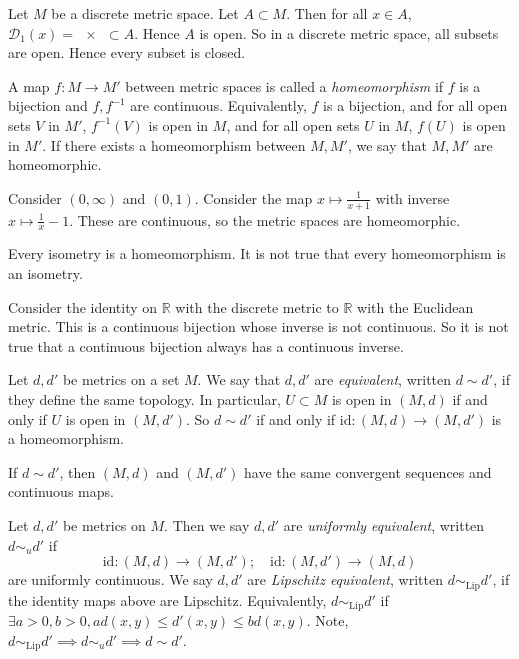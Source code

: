 \begin{example}
    Let \( M \) be a discrete metric space.
    Let \( A \subset M \).
    Then for all \( x \in A \), \( \mathcal D_1(x) = \qty{x} \subset A \).
    Hence \( A \) is open.
    So in a discrete metric space, all subsets are open.
    Hence every subset is closed.
\end{example}
\begin{definition}
    A map \( f \colon M \to M' \) between metric spaces is called a \textit{homeomorphism} if \( f \) is a bijection and \( f, f^{-1} \) are continuous.
    Equivalently, \( f \) is a bijection, and for all open sets \( V \) in \( M' \), \( f^{-1}(V) \) is open in \( M \), and for all open sets \( U \) in \( M \), \( f(U) \) is open in \( M' \).
    If there exists a homeomorphism between \( M, M' \), we say that \( M, M' \) are homeomorphic.
\end{definition}
\begin{example}
    Consider \( (0,\infty) \) and \( (0,1) \).
    Consider the map \( x \mapsto \frac{1}{x+1} \) with inverse \( x \mapsto \frac{1}{x} - 1 \).
    These are continuous, so the metric spaces are homeomorphic.
\end{example}
\begin{remark}
    Every isometry is a homeomorphism.
    It is not true that every homeomorphism is an isometry.

    Consider the identity on \( \mathbb R \) with the discrete metric to \( \mathbb R \) with the Euclidean metric.
    This is a continuous bijection whose inverse is not continuous.
    So it is not true that a continuous bijection always has a continuous inverse.
\end{remark}
\begin{definition}
    Let \( d, d' \) be metrics on a set \( M \).
    We say that \( d, d' \) are \textit{equivalent}, written \( d \sim d' \), if they define the same topology.
    In particular, \( U \subset M \) is open in \( (M,d) \) if and only if \( U \) is open in \( (M,d') \).
    So \( d \sim d' \) if and only if \( \mathrm{id} \colon (M,d) \to (M,d') \) is a homeomorphism.
\end{definition}
\begin{remark}
    If \( d \sim d' \), then \( (M,d) \) and \( (M, d') \) have the same convergent sequences and continuous maps.
\end{remark}
\begin{definition}
    Let \( d, d' \) be metrics on \( M \).
    Then we say \( d, d' \) are \textit{uniformly equivalent}, written \( d \sim_u d' \) if
    \[ \mathrm{id} \colon (M, d) \to (M, d');\quad \mathrm{id} \colon (M, d') \to (M, d) \]
    are uniformly continuous.
    We say \( d, d' \) are \textit{Lipschitz equivalent}, written \( d \sim_\mathrm{Lip} d' \), if the identity maps above are Lipschitz.
    Equivalently, \( d \sim_\mathrm{Lip} d' \) if \( \exists a > 0, b > 0, ad(x,y) \leq d'(x,y) \leq bd(x,y) \).
    Note, \( d \sim_\mathrm{Lip} d' \implies d \sim_u d' \implies d \sim d' \).
\end{definition}
